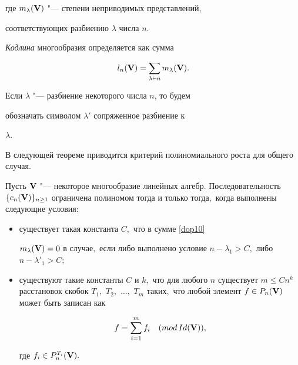 где $m_{\lambda}({\bf V})$ "--- степени неприводимых представлений,

соответствующих разбиению $\lambda$ числа $n$.

{\it Кодлина} многообразия определяется как сумма

$$

l_n({\bf V})=\sum_{\lambda \vdash n}m_{\lambda}({\bf V}).

$$

Если $\lambda$ "--- разбиение некоторого числа $n$, то будем

обозначать символом $\lambda' $ сопряженное разбиение к

$\lambda$.



В следующей теореме приводится критерий полиномиального роста для общего случая.



\begin{theorem}

Пусть ${\bf V}$ "--- некоторое многообразие линейных алгебр. Последовательность $\{c_n({\bf V})\}_{n \geq 1}$ ограничена полиномом тогда и только тогда$,$ когда выполнены следующие условия\/{\rm :}

\begin{itemize}

\item[\rm (i)] существует такая константа $C,$ что в сумме \eqref{dop10}

 $m_\lambda({\bf V}) = 0$ в случае$,$ если либо выполнено условие $n -

\lambda_1 > C,$ либо $n -\lambda' _1 > C;$



\item[\rm (ii)] существуют такие константы $C$ и $k,$ что для любого $n$ существует $m\leq Cn^k$ расстановок скобок $T_1,$ $T_2,$ $\dots ,$ $T_m$ таких$,$ что любой элемент $f\in P_n({\bf V})$ может быть записан как

$$

f = \sum_{i=1}^mf_i \quad (\mathop{mod} Id({\bf V})),

$$

где $f_i \in P_n^{T_i}({\bf V}).$



\end{itemize}

\end{theorem}





